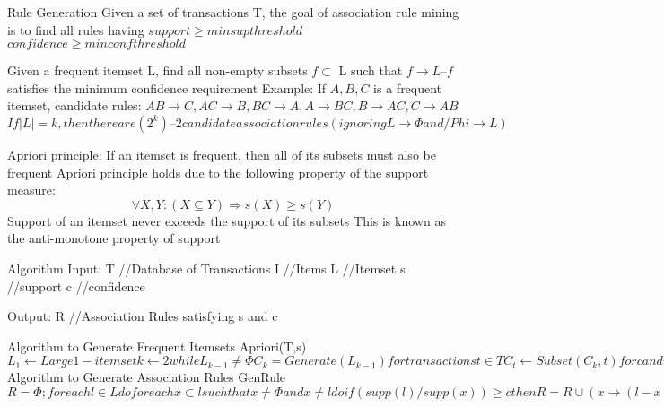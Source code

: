 Rule Generation
Given a set of transactions T, the goal of association rule mining is to find all rules having
$support \geq minsup threshold$
$confidence \geq minconf threshold$

Given a frequent itemset L, find all non-empty subsets $f \subset$ L such that $f \rightarrow L – f$ satisfies the minimum confidence requirement
Example: If ${A, B, C}$ is a frequent itemset, candidate rules:
${ AB \rightarrow C, AC \rightarrow B, BC \rightarrow A, A \rightarrow BC, B \rightarrow AC, C \rightarrow AB }$
$If |L| = k, then there are (2 ^ k) – 2 candidate association rules (ignoring L \rightarrow \Phi and /Phi \rightarrow L)$


Apriori principle:
If an itemset is frequent, then all of its subsets must also be frequent
Apriori principle holds due to the following property of the support measure:
\begin{equation}
\forall X , Y : ( X \subseteq Y ) \Rightarrow s( X ) \geq s(Y )
\end{equation}
Support of an itemset never exceeds the support of its subsets
This is known as the anti-monotone property of support


Algorithm
Input:
T //Database of Transactions
I //Items
L //Itemset
s //support
c //confidence

Output:
R //Association Rules satisfying s and c

Algorithm to Generate Frequent Itemsets
Apriori(T,s)
$
L_{1} \leftarrow {Large 1-itemset}
k \leftarrow 2
while L_{k - 1} \neq \Phi
C_{k} = Generate(L_{k - 1})
for transactions t \in T
C_{t} \leftarrow Subset(C_{k}, t)
for candidates c \in C_{t}
count[c] \leftarrow count[c] + 1
L_{k} \leftarrow {c \in C_{k} | count[c] \geq s}
k \leftarrow k + 1
return \cup L_{k}
$
Algorithm to Generate Association Rules
GenRule
$
R = \Phi;
for each l \in L do
for each x \subset l such that x \neq \Phi and x \neq l do
if (supp(l) / supp(x)) \geq c then
R = R \cup ( x \rightarrow ( l - x ) );
$